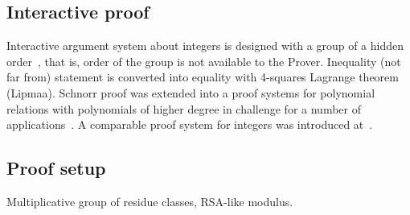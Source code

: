 \documentclass{llncs}
\begin{document}
\subsection{Interactive proof}

Interactive argument system about integers is designed
with a group of a hidden order~\cite{},
that is, order of the group is not available to the Prover.
Inequality (not far from) statement is converted into equality
with 4-squares Lagrange theorem (Lipmaa).
Schnorr proof was extended into a proof systems for polynomial relations
with polynomials of higher degree in challenge
for a number of applications~\cite{F363,CF12}.
A comparable proof system for integers was introduced at~\cite{F10}.

\subsection{Proof setup}

Multiplicative group of residue classes, RSA-like modulus.
\end{document}
